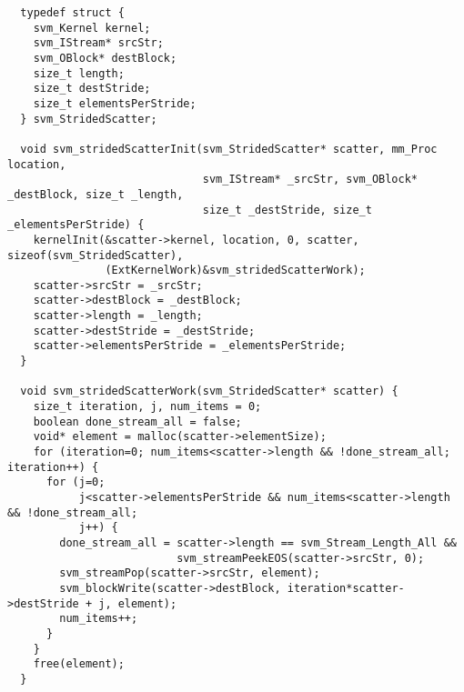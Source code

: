 \clearpage
\makeline
{}
{\small
\begin{verbatim}
  typedef struct {
    svm_Kernel kernel;
    svm_IStream* srcStr;
    svm_OBlock* destBlock;
    size_t length;
    size_t destStride;
    size_t elementsPerStride;
  } svm_StridedScatter;

  void svm_stridedScatterInit(svm_StridedScatter* scatter, mm_Proc location, 
                              svm_IStream* _srcStr, svm_OBlock* _destBlock, size_t _length,
                              size_t _destStride, size_t _elementsPerStride) {
    kernelInit(&scatter->kernel, location, 0, scatter, sizeof(svm_StridedScatter), 
               (ExtKernelWork)&svm_stridedScatterWork);
    scatter->srcStr = _srcStr;
    scatter->destBlock = _destBlock;
    scatter->length = _length;
    scatter->destStride = _destStride;
    scatter->elementsPerStride = _elementsPerStride;
  }

  void svm_stridedScatterWork(svm_StridedScatter* scatter) {
    size_t iteration, j, num_items = 0;
    boolean done_stream_all = false;
    void* element = malloc(scatter->elementSize);
    for (iteration=0; num_items<scatter->length && !done_stream_all; iteration++) {
      for (j=0; 
           j<scatter->elementsPerStride && num_items<scatter->length && !done_stream_all; 
           j++) {
        done_stream_all = scatter->length == svm_Stream_Length_All && 
                          svm_streamPeekEOS(scatter->srcStr, 0);
        svm_streamPop(scatter->srcStr, element);
        svm_blockWrite(scatter->destBlock, iteration*scatter->destStride + j, element);
        num_items++;
      }
    }
    free(element);
  }
\end{verbatim}}

